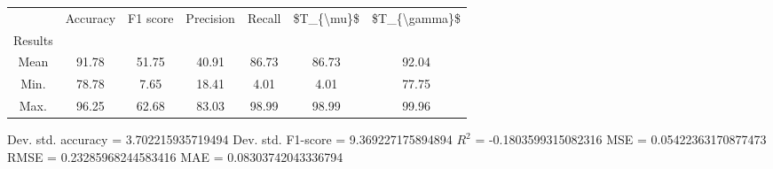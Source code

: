 \begin{tabular}{|c|c|c|c|c|c|c|}
\toprule
{} &  Accuracy &  F1 score &  Precision &  Recall &  \$T\_\{\textbackslash mu\}\$ &  \$T\_\{\textbackslash gamma\}\$ \\
Results &           &           &            &         &            &               \\
\hline
Mean    &     91.78 &     51.75 &      40.91 &   86.73 &      86.73 &         92.04 \\
Min.    &     78.78 &      7.65 &      18.41 &    4.01 &       4.01 &         77.75 \\
Max.    &     96.25 &     62.68 &      83.03 &   98.99 &      98.99 &         99.96 \\
\bottomrule
\end{tabular}

 Dev. std. accuracy = 3.702215935719494
 Dev. std. F1-score = 9.369227175894894
 $R^2$ = -0.1803599315082316
 MSE = 0.05422363170877473
 RMSE = 0.23285968244583416
 MAE = 0.08303742043336794